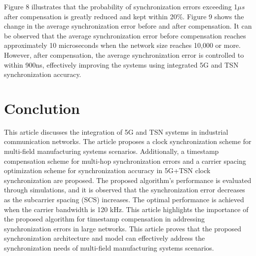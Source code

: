 \documentclass[english]{cccconf}
\begin{document}
Figure 8 illustrates that the probability of synchronization errors exceeding 1$\mu s$ after compensation is greatly reduced and kept within 20\%. Figure 9 shows the change in the average synchronization error before and after compensation. It can be observed that the average synchronization error before compensation reaches approximately 10 microseconds when the network size reaches 10,000 or more. However, after compensation, the average synchronization error is controlled to within 900ns, effectively improving the systems using integrated 5G and TSN synchronization accuracy.
\section{Conclution}
This article discusses the integration of 5G and TSN systems in industrial communication networks. The article proposes a clock synchronization scheme for multi-field manufacturing systems scenarios. Additionally, a timestamp compensation scheme for multi-hop synchronization errors and a carrier spacing optimization scheme for synchronization accuracy in 5G+TSN clock synchronization are proposed. The proposed algorithm's performance is evaluated through simulations, and it is observed that the synchronization error decreases as the subcarrier spacing (SCS) increases. The optimal performance is achieved when the carrier bandwidth is 120 kHz. This article highlights the importance of the proposed algorithm for timestamp compensation in addressing synchronization errors in large networks. This article proves that the proposed synchronization architecture and model can effectively address the synchronization needs of multi-field manufacturing systems scenarios.


\end{document}
